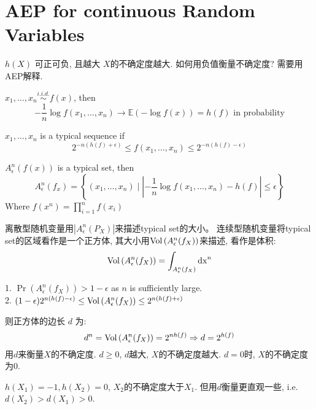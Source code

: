 \section{AEP for continuous Random Variables}
$h(X)$ 可正可负, 且越大 $X$的不确定度越大. 如何用负值衡量不确定度? 需要用AEP解释.

\begin{theorem}
$x_1,\ldots,x_n\stackrel{i.i.d.}{\sim} f(x)$, then
$$-\dfrac{1}{n}\log f(x_1,\ldots,x_n)\to \mathbb{E}\left(-\log f(x)\right)=h(f) \text{ in probability}$$
\end{theorem}

\begin{definition}
$x_1,\ldots,x_n$ is a typical sequence if
$$2^{-n(h(f)+\epsilon)}\leq f(x_1,\ldots,x_n)\leq 2^{-n(h(f)-\epsilon)}$$
\end{definition}

\begin{definition}
$A_{\epsilon}^n(f(x))$ is a typical set, then
$$A_{\epsilon}^n(f_x)=\left\{(x_1,\ldots,x_n) \mid \left|-\dfrac{1}{n}\log f(x_1,\ldots,x_n)-h(f)\right|\leq \epsilon\right\}$$
Where $f(x^n)=\prod\limits_{i=1}^n f(x_i)$
\end{definition}

离散型随机变量用$\left|A_{\epsilon}^n(P_X)\right|$来描述typical set的大小。 连续型随机变量将typical set的区域看作是一个正方体, 其大小用$\operatorname{Vol}\left(A_{\epsilon}^n(f_X)\right)$来描述, 看作是体积:
$$\operatorname{Vol}\left(A_{\epsilon}^n(f_X)\right)=\int_{A_{\epsilon}^n(f_X)}\operatorname{dx}^n$$

\begin{proposition}
1. $\Pr\left(A_{\epsilon}^n(f_X)\right) > 1-\epsilon$ as $n$ is sufficiently large. \\
2. $(1-\epsilon)2^{n\left(h(f)-\epsilon\right)} \leq \operatorname{Vol}\left(A_{\epsilon}^n(f_X)\right)\leq 2^{n\left(h(f)+\epsilon\right)}$
\end{proposition}

则正方体的边长 $d$ 为:
$$d^n = \operatorname{Vol}\left(A_{\epsilon}^n(f_X)\right) = 2^{nh(f)} \Rightarrow d=2^{h(f)}$$
用$d$来衡量$X$的不确定度. $d\geq 0$, $d$越大, $X$的不确定度越大. $d=0$时, $X$的不确定度为$0$.

$h(X_1)=-1,h(X_2)=0$, $X_2$的不确定度大于$X_1$. 但用$d$衡量更直观一些, i.e. $d(X_2)>d(X_1)>0$.